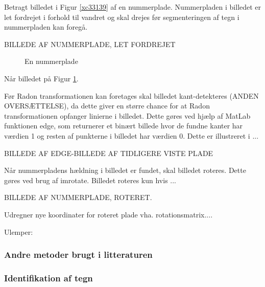 Betragt billedet i Figur \ref{xc33139} af en nummerplade. Nummerpladen i billedet er let fordrejet i forhold til vandret og skal drejes før segmenteringen af tegn i nummerpladen kan foregå.

BILLEDE AF NUMMERPLADE, LET FORDREJET

\begin{figure}[htp]
\caption{En nummerplade}
\label{fig:xc33139}
\end{figure}

Når billedet på Figur \ref{fig:xc33139}.

Før Radon transformationen kan foretages skal billedet kant-detekteres (ANDEN OVERSÆTTELSE), da dette giver en større chance for at Radon transformationen opfanger linierne i billedet. Dette gøres ved hjælp af MatLab funktionen edge, som returnerer et binært billede hvor de fundne kanter har værdien 1 og resten af punkterne i billedet har værdien 0. Dette er illustreret i ...

BILLEDE AF EDGE-BILLEDE AF TIDLIGERE VISTE PLADE


Når nummerpladens hældning i billedet er fundet, skal billedet roteres. Dette gøres ved brug af imrotate. Billedet roteres kun hvis ...

BILLEDE AF NUMMERPLADE, ROTERET.

Udregner nye koordinater for roteret plade vha. rotationsmatrix....

Ulemper:

\subsubsection*{Andre metoder brugt i litteraturen}


\subsubsection{Identifikation af tegn}

\begin{comment}
Se nrpl.dk: Hvert af de op til 7 tegn på nummerpladen har et imaginært "felt" de kan brede sig i. Ikke alle tegn er lige brede, og generelt er bogstaver bredere end tal. "Feltet" til bogstaver er derfor bredere end feltet til tegn. Enkelte tegn er for smalle til at udfylde deres "felt", så designeren har fundet det hensigtsmæssigt at placere disse tegn visuelt centreret inden for deres "felt".

"Således vil en nummerplade som MB 20 001 på grund af venstrestillingen af det sidste 1-tal have større mellemrum mellem højre kant og sidste tal end mellem venstre kant og første bogstav"
\end{comment}

